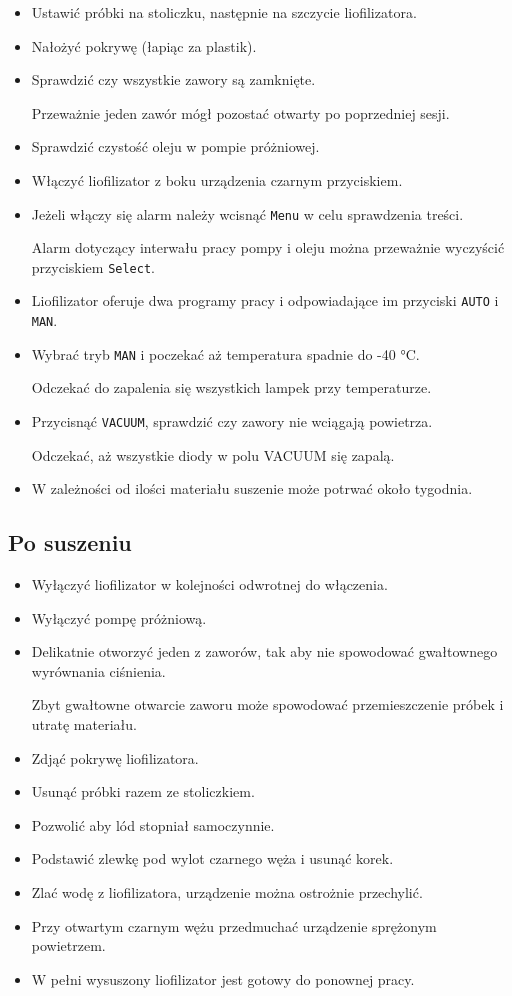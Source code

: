 \documentclass[
  letterpaper,
  DIV=11,
  numbers=noendperiod]{scrreprt}
\begin{document}
\begin{itemize}
\item
  Ustawić próbki na stoliczku, następnie na szczycie liofilizatora.
\item
  Nałożyć pokrywę (łapiąc za plastik).
\item
  Sprawdzić czy wszystkie zawory są zamknięte.

  Przeważnie jeden zawór mógł pozostać otwarty po poprzedniej sesji.
\item
  Sprawdzić czystość oleju w pompie próżniowej.
\item
  Włączyć liofilizator z boku urządzenia czarnym przyciskiem.
\item
  Jeżeli włączy się alarm należy wcisnąć \texttt{Menu} w celu
  sprawdzenia treści.

  Alarm dotyczący interwału pracy pompy i oleju można przeważnie
  wyczyścić przyciskiem \texttt{Select}.
\item
  Liofilizator oferuje dwa programy pracy i odpowiadające im przyciski
  \texttt{AUTO} i \texttt{MAN}.
\item
  Wybrać tryb \texttt{MAN} i poczekać aż temperatura spadnie do -40 °C.

  Odczekać do zapalenia się wszystkich lampek przy temperaturze.
\item
  Przycisnąć \texttt{VACUUM}, sprawdzić czy zawory nie wciągają
  powietrza.

  Odczekać, aż wszystkie diody w polu VACUUM się zapalą.
\item
  W zależności od ilości materiału suszenie może potrwać około tygodnia.
\end{itemize}

\hypertarget{po-suszeniu}{%
\subsection{Po suszeniu}\label{po-suszeniu}}

\begin{itemize}
\item
  Wyłączyć liofilizator w kolejności odwrotnej do włączenia.
\item
  Wyłączyć pompę próżniową.
\item
  Delikatnie otworzyć jeden z zaworów, tak aby nie spowodować
  gwałtownego wyrównania ciśnienia.

  Zbyt gwałtowne otwarcie zaworu może spowodować przemieszczenie próbek
  i utratę materiału.
\item
  Zdjąć pokrywę liofilizatora.
\item
  Usunąć próbki razem ze stoliczkiem.
\item
  Pozwolić aby lód stopniał samoczynnie.
\item
  Podstawić zlewkę pod wylot czarnego węża i usunąć korek.
\item
  Zlać wodę z liofilizatora, urządzenie można ostrożnie przechylić.
\item
  Przy otwartym czarnym wężu przedmuchać urządzenie sprężonym
  powietrzem.
\item
  W pełni wysuszony liofilizator jest gotowy do ponownej pracy.
\end{itemize}
\end{document}
